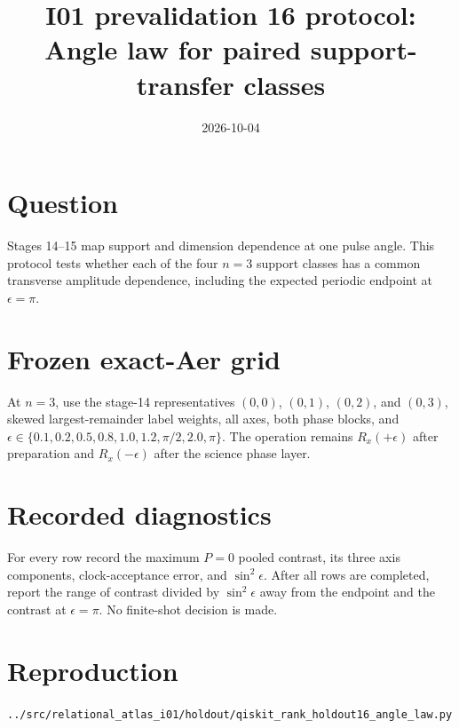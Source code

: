 \documentclass[11pt]{article}
\begin{document}
\title{I01 prevalidation 16 protocol:\\Angle law for paired support-transfer classes}
\date{2026-10-04}
\maketitle

\section*{Question}
Stages 14--15 map support and dimension dependence at one pulse angle. This protocol
tests whether each of the four $n=3$ support classes has a common transverse
amplitude dependence, including the expected periodic endpoint at $\epsilon=\pi$.

\section*{Frozen exact-Aer grid}
At $n=3$, use the stage-14 representatives $(0,0)$, $(0,1)$, $(0,2)$, and $(0,3)$,
skewed largest-remainder label weights, all axes, both phase blocks, and
$\epsilon\in\{0.1,0.2,0.5,0.8,1.0,1.2,\pi/2,2.0,\pi\}$. The operation remains
$R_x(+\epsilon)$ after preparation and $R_x(-\epsilon)$ after the science phase
layer.

\section*{Recorded diagnostics}
For every row record the maximum $P=0$ pooled contrast, its three axis components,
clock-acceptance error, and $\sin^2\epsilon$. After all rows are completed, report
the range of contrast divided by $\sin^2\epsilon$ away from the endpoint and the
contrast at $\epsilon=\pi$. No finite-shot decision is made.

\section*{Reproduction}
\texttt{../src/relational\_atlas\_i01/holdout/qiskit\_rank\_holdout16\_angle\_law.py}
\end{document}
